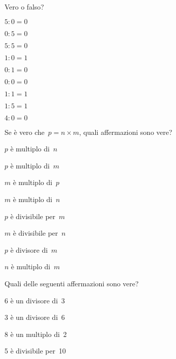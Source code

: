 \begin{esercizio}
 Vero o falso?
\begin{htmulticols}{3}
\TabPositions{2.2cm}
\begin{enumeratees}
 \item \(5:0=0\) \tab \verofalso
 \item \(0:5=0\) \tab \verofalso
 \item \(5:5=0\) \tab \verofalso
 \item \(1:0=1\) \tab \verofalso
 \item \(0:1=0\) \tab \verofalso
 \item \(0:0=0\) \tab \verofalso
 \item \(1:1=1\) \tab \verofalso
 \item \(1:5=1\) \tab \verofalso
 \item \(4:0=0\) \tab \verofalso
\end{enumeratees}
\end{htmulticols}
\end{esercizio}

\begin{esercizio}
 Se è vero che~\(p=n\times m\), quali affermazioni sono vere?
\begin{htmulticols}{2}
\TabPositions{3.5cm}
\begin{enumeratees}
 \item \(p\) è multiplo di~\(n\) \tab \verofalso
 \item \(p\) è multiplo di~\(m\) \tab \verofalso
 \item \(m\) è multiplo di~\(p\) \tab \verofalso
 \item \(m\) è multiplo di~\(n\) \tab \verofalso
 \item \(p\) è divisibile per~\(m\) \tab \verofalso
 \item \(m\) è divisibile per~\(n\) \tab \verofalso
 \item \(p\) è divisore di~\(m\) \tab \verofalso
 \item \(n\) è multiplo di~\(m\) \tab \verofalso
\end{enumeratees}
\end{htmulticols}
\end{esercizio}

\begin{esercizio}
 Quali delle seguenti affermazioni sono vere?

\begin{htmulticols}{2}
\TabPositions{3.5cm}
 \begin{enumeratees}
 \item 6 è un divisore di~3 \tab \verofalso
 \item 3 è un divisore di~6 \tab \verofalso
 \item 8 è un multiplo di~2 \tab \verofalso
 \item 5 è divisibile per~10 \tab \verofalso
 \end{enumeratees}
\end{htmulticols}
\end{esercizio}

